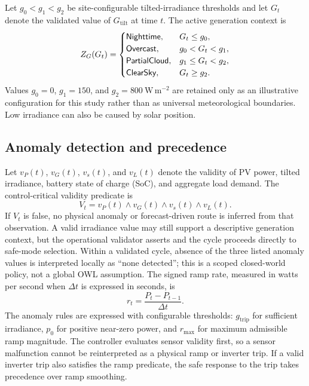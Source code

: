 Let $g_0<g_1<g_2$ be site-configurable tilted-irradiance thresholds and let $G_t$ denote the validated value of $G_{\mathrm{tilt}}$ at time $t$. The active generation context is
\begin{equation*}
Z_G(G_t)=
\begin{cases}
\textsf{Nighttime}, & G_t\leq g_0,\\
\textsf{Overcast}, & g_0<G_t<g_1,\\
\textsf{PartialCloud}, & g_1\leq G_t<g_2,\\
\textsf{ClearSky}, & G_t\geq g_2.
\end{cases}
\end{equation*}
Values $g_0=0$, $g_1=150$, and $g_2=800\ \mathrm{W\,m^{-2}}$ are retained only as an illustrative configuration for this study rather than as universal meteorological boundaries. Low irradiance can also be caused by solar position.

\subsection{Anomaly detection and precedence}

Let $v_P(t)$, $v_G(t)$, $v_s(t)$, and $v_L(t)$ denote the validity of PV power, tilted irradiance, battery state of charge (SoC), and aggregate load demand. The control-critical validity predicate is
\begin{equation*}
V_t=v_P(t)\wedge v_G(t)\wedge v_s(t)\wedge v_L(t).
\end{equation*}
If $V_t$ is false, no physical anomaly or forecast-driven route is inferred from that observation. A valid irradiance value may still support a descriptive generation context, but the operational validator asserts  and the cycle proceeds directly to safe-mode selection. Within a validated cycle, absence of the three listed anomaly values is interpreted locally as ``none detected''; this is a scoped closed-world policy, not a global OWL assumption. The signed ramp rate, measured in watts per second when $\Delta t$ is expressed in seconds, is
\begin{equation}
\label{eq:signed-ramp}
r_t=\frac{P_t-P_{t-1}}{\Delta t}.
\end{equation}
The anomaly rules are expressed with configurable thresholds: $g_{\mathrm{trip}}$ for sufficient irradiance, $p_0$ for positive near-zero power, and $r_{\max}$ for maximum admissible ramp magnitude. The controller evaluates sensor validity first, so a sensor malfunction cannot be reinterpreted as a physical ramp or inverter trip. If a valid inverter trip also satisfies the ramp predicate, the safe response to the trip takes precedence over ramp smoothing.

